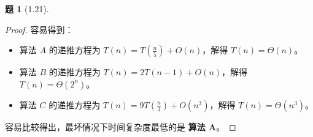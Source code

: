 \documentclass[11pt, a4paper]{article}
\newtheorem{problem}{题}
\begin{document}
\vspace{1em}

\begin{problem}[1.21]
\end{problem}

\begin{proof}
    \leavevmode
    容易得到：
    \begin{itemize}
        \item 算法 $A$ 的递推方程为 $T(n) = T\left(\frac{n}{5}\right) + O(n)$，解得 $T(n) = \Theta(n)$。
        \item 算法 $B$ 的递推方程为 $T(n) = 2T(n-1) + O(n)$，解得 $T(n) = \Theta(2^n)$。
        \item 算法 $C$ 的递推方程为 $T(n) = 9T\left(\frac{n}{3}\right) + O(n^3)$，解得 $T(n) = \Theta(n^3)$。
    \end{itemize}
    容易比较得出，最坏情况下时间复杂度最低的是 \textbf{算法 $\mathbf{A}$}。
\end{proof}
\end{document}
